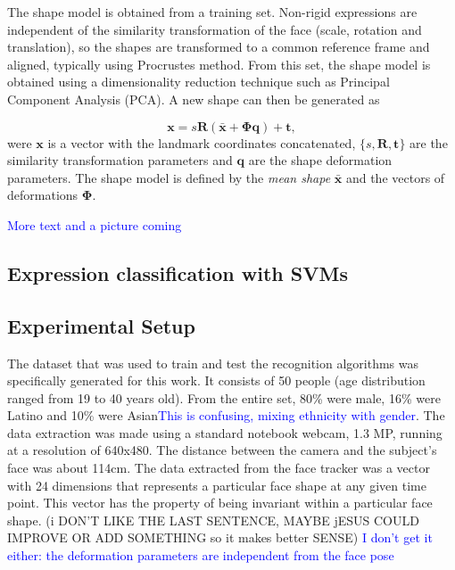 \documentclass[]{article}
\begin{document}
The shape model is obtained from a training set. Non-rigid expressions
are independent of the similarity transformation of the face (scale,
rotation and translation), so the shapes are transformed
to a common reference frame and aligned, typically using Procrustes
method. From this set, the shape model is obtained using a
dimensionality reduction technique such as Principal Component
Analysis (PCA). A new shape can then be generated as

\begin{equation}
  \label{eq:shape_model}
  \mathbf{x} = s\mathbf{R}(\bar{\mathbf{x}} +
  \boldsymbol{\Phi}\mathbf{q}) + \mathbf{t},
\end{equation}
were $\mathbf{x}$ is a vector with the landmark coordinates concatenated, 
$\{s,\mathbf{R},\mathbf{t}\}$ are the similarity transformation
parameters and $\mathbf{q}$ are the shape deformation parameters. The
shape model is defined by the \textit{mean shape} $\mathbf{\bar{x}}$
and the vectors of deformations $\boldsymbol{\Phi}$.

\textcolor{blue}{More text and a picture coming}


\subsection{Expression classification with SVMs}
\label{sec:expr_class}



\subsection{Experimental Setup}
The dataset that was used to train and test the recognition algorithms was specifically generated for this work. It
consists of 50 people (age distribution ranged from 19 to 40 years old). From the entire set, 80\% were male, 16\% were
Latino and 10\% were Asian\textcolor{blue}{This is confusing, mixing ethnicity with gender}. The data extraction was made using a standard notebook webcam, 1.3 MP, running at a
resolution of 640x480. The distance between the camera and the subject's face was about 114cm. The data extracted from
the face tracker was a vector with 24 dimensions that represents a particular face shape at any given time point. This
vector has the property of being invariant within a particular face shape.
(i DON'T LIKE THE LAST SENTENCE, MAYBE jESUS COULD IMPROVE OR ADD SOMETHING so it makes better SENSE)
\textcolor{blue}{I don't get it either: the deformation parameters are independent from the face pose}
\end{document}
